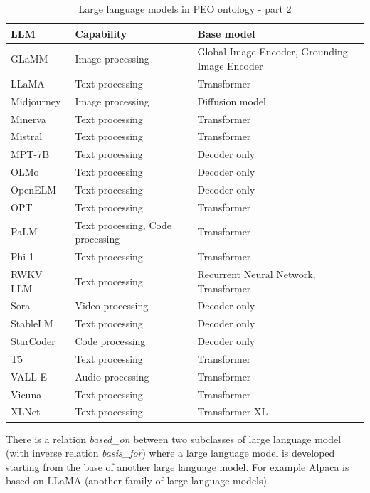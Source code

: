 \begin{table}[H]
    \centering
    \begin{tabular}{|>{\raggedright\arraybackslash}p{4cm}|>{\raggedright\arraybackslash}p{4cm}|>{\raggedright\arraybackslash}p{4cm}|}
        \hline
        \textbf{LLM} & \textbf{Capability} & \textbf{Base model} \\ \hline
        GLaMM & Image processing & Global Image Encoder, Grounding Image Encoder \\ \hline
        LLaMA & Text processing & Transformer \\ \hline
        Midjourney & Image processing & Diffusion model  \\ \hline
        Minerva & Text processing & Transformer \\ \hline
        Mistral & Text processing & Transformer \\ \hline
        MPT-7B & Text processing & Decoder only \\ \hline
        OLMo & Text processing & Decoder only \\ \hline
        OpenELM & Text processing & Decoder only \\ \hline
        OPT & Text processing & Transformer \\ \hline
        PaLM & Text processing, Code processing & Transformer \\ \hline
        Phi-1 & Text processing & Transformer \\ \hline
        RWKV LLM & Text processing & Recurrent Neural Network, Transformer \\ \hline
        Sora & Video processing & Decoder only \\ \hline
        StableLM & Text processing & Decoder only \\ \hline
        StarCoder & Code processing & Decoder only \\ \hline
        T5 & Text processing & Transformer \\ \hline
        VALL-E & Audio processing & Transformer \\ \hline
        Vicuna & Text processing & Transformer \\ \hline
        XLNet & Text processing & Transformer XL \\ \hline
    \end{tabular}
    \caption{Large language models in PEO ontology - part 2}
\end{table}
There is a relation \textit{based\_on} between two subclasses of large language model (with inverse relation \textit{basis\_for}) where a large language model is developed starting from the base of another large language model. For example Alpaca is based on LLaMA (another family of large language models).\\
